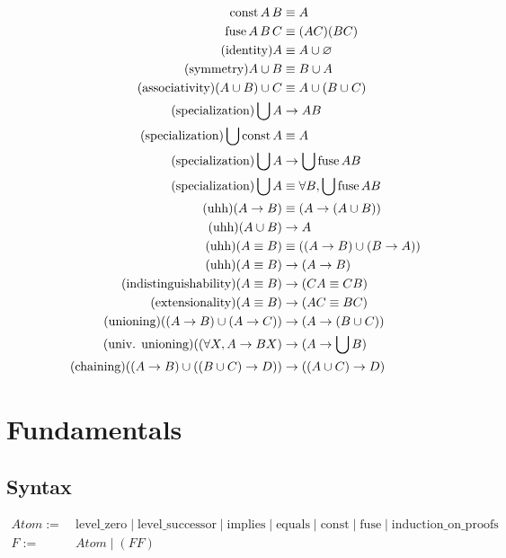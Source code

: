 \documentclass{article}
\begin{document}
  \begin{align*}
    \operatorname{\mathrm{const}} A\,B &\equiv A\\
    \operatorname{\mathrm{fuse}} A\,B\,C &\equiv (AC)(BC)\\
    \tag{identity}
    A &\equiv A \cup \varnothing\\
    \tag{symmetry}
    A \cup B &\equiv B \cup A\\
    \tag{associativity}
    (A \cup B) \cup C &\equiv A \cup (B \cup C)\\
    \tag{specialization}
    \bigcup A &\to A B\\
    \tag{specialization}
    \bigcup \operatorname{\mathrm{const}} A &\equiv A\\
    \tag{specialization}
    \bigcup A &\to \bigcup \operatorname{\mathrm{fuse}} A B\\
    \tag{specialization}
    \bigcup A &\equiv \forall B, \bigcup \operatorname{\mathrm{fuse}} A B\\
    \tag{uhh}
    (A \to B) &\equiv (A \to (A \cup B))\\
    \tag{uhh}
    (A \cup B) &\to A\\
    \tag{uhh}
    (A \equiv B) &\equiv ((A \to B) \cup (B \to A))\\
    \tag{uhh}
    (A \equiv B) &\to (A \to B)\\
    \tag{indistinguishability}
    (A \equiv B) &\to (CA \equiv CB)\\
    \tag{extensionality}
    (A \equiv B) &\to (AC \equiv BC)\\
    \tag{unioning}
    ((A \to B) \cup (A \to C)) &\to (A \to (B \cup C))\\
    \tag{univ. unioning}
    ((\forall X, A \to B X) &\to (A \to \bigcup B)\\
    \tag{chaining}
    ((A \to B) \cup ((B \cup C) \to D)) &\to ((A \cup C) \to D)\\
  \end{align*}
  \fi
  
  
  \section{Fundamentals}\label{fundamentals}

  \subsection{Syntax}
  \begin{align*}
     Atom :=&\ \mathrm{level\_zero} \mid \mathrm{level\_successor} \mid \mathrm{implies} \mid \mathrm{equals} \mid \mathrm{const} \mid \mathrm{fuse} \mid \mathrm{induction\_on\_proofs}\\
     F :=&\ Atom \mid (F F)
  \end{align*}
\end{document}
